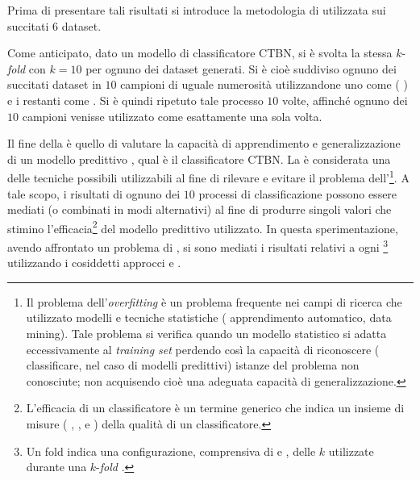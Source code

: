 Prima di presentare tali risultati si introduce la metodologia di  utilizzata sui succitati $6$ dataset.

Come anticipato, dato un modello di classificatore \acs{CTBN}, si è svolta la stessa $k$-\emph{fold } con $k = 10$ per ognuno dei dataset generati. Si è cioè suddiviso ognuno dei succitati dataset in $10$ campioni di uguale numerosità utilizzandone uno come \emph{} (\ie{} \emph{}) e i restanti come \emph{}. Si è quindi ripetuto tale processo $10$ volte, affinché ognuno dei $10$ campioni venisse utilizzato come \emph{} esattamente una sola volta.

Il fine della \emph{} è quello di valutare la capacità di apprendimento e generalizzazione di un modello predittivo \citep[si veda][capitolo $7$]{Hastie2001}, qual è il classificatore \acs{CTBN}. La \emph{} è considerata una delle tecniche possibili utilizzabili al fine di rilevare e evitare il problema dell'\emph{}\footnote{Il problema dell'\emph{overfitting} è un problema frequente nei campi di ricerca che utilizzato modelli e tecniche statistiche (\eg{} apprendimento automatico, data mining). Tale problema si verifica quando un modello statistico si adatta eccessivamente al \emph{training set} perdendo così la capacità di riconoscere (\ie{} classificare, nel caso di modelli predittivi) istanze del problema non conosciute; non acquisendo cioè una adeguata capacità di generalizzazione.}. A tale scopo, i risultati di ognuno dei $10$ processi di classificazione possono essere mediati (o combinati in modi alternativi) al fine di produrre singoli valori che stimino l'efficacia\footnote{L'efficacia di un classificatore è un termine generico che indica un insieme di misure (\eg{} \emph{}, \emph{}, \emph{} e \emph{}) della qualità di un classificatore.} del modello predittivo utilizzato. In questa sperimentazione, avendo affrontato un problema di \emph{}, si sono mediati i risultati relativi a ogni \emph{}\footnote{Un fold indica una configurazione, comprensiva di \emph{} e \emph{}, delle $k$ utilizzate durante una $k$-\emph{fold }.} utilizzando i cosiddetti approcci \emph{} e \emph{}.

